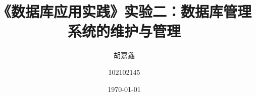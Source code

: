 

\title{《数据库应用实践》实验二：数据库管理系统的维护与管理}
\author{胡嘉鑫 \and 102102145}
\date{\today}





\maketitle

\tableofcontents




